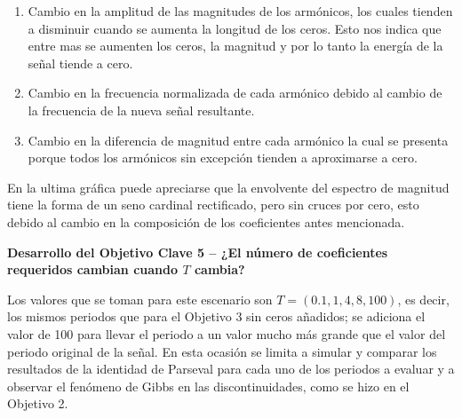 \documentclass[11pt,a4paper,twocolumn]{article}
\begin{document}
    \begin{enumerate}
        \item Cambio en la amplitud de las magnitudes de los armónicos, los cuales tienden a 
            disminuir cuando se aumenta la longitud de los ceros. Esto nos indica que entre 
            mas se aumenten los ceros, la magnitud y por lo tanto la energía de la señal tiende 
            a cero.
        \item Cambio en la frecuencia normalizada de cada armónico debido al cambio de la 
            frecuencia de la nueva señal resultante.
        \item Cambio en la diferencia de magnitud entre cada armónico la cual se presenta 
            porque todos los armónicos sin excepción tienden a aproximarse a cero.
    \end{enumerate}

    En la ultima gráfica puede apreciarse que la envolvente del espectro de magnitud tiene la 
    forma de un seno cardinal rectificado, pero sin cruces por cero, esto debido al cambio en 
    la composición de los coeficientes antes mencionada.

    \textbf{Desarrollo del Objetivo Clave 5 -- ¿El número de coeficientes requeridos cambian cuando $T$ cambia?}
    
    Los valores que se toman para este escenario son $T=(0.1,1,4,8,100)$, es decir, los mismos 
    periodos que para el Objetivo 3 sin ceros añadidos; se adiciona el valor de 100 para llevar el 
    periodo a un valor mucho más grande que el valor del periodo original de la señal. En esta 
    ocasión se limita a simular y comparar los resultados de la identidad de Parseval para cada uno de 
    los periodos a evaluar y a observar el fenómeno de Gibbs en las discontinuidades, como se hizo en 
    el Objetivo 2.

\end{document}
